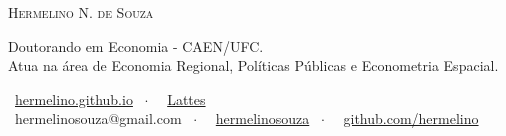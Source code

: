 \documentclass[a4paper,12pt]{article}
\begin{document}
	\par{\centering
		{\huge \textsc{Hermelino N. de Souza}}
		\par}

	\small
	\begin{center}
		Doutorando em Economia - CAEN/UFC. \\
		Atua na área de Economia Regional, Políticas Públicas e Econometria Espacial.
	\end{center}

	\begin{center}
			\small
			\faHome \ \href{https://hermelino.github.io/}{hermelino.github.io} \ $\cdot$ \ \faUniversity \ \href{http://lattes.cnpq.br/3460004816166577}{Lattes}   \\ %
			\faEnvelope \ hermelinosouza@gmail.com \ $\cdot$ \ \faLinkedin \ \href{https://www.linkedin.com/in/hermelinosouza}{hermelinosouza} \ $\cdot$ \ \faGithub \ \href{https://github.com/hermelino}{github.com/hermelino} \\
	\end{center}
\end{document}

